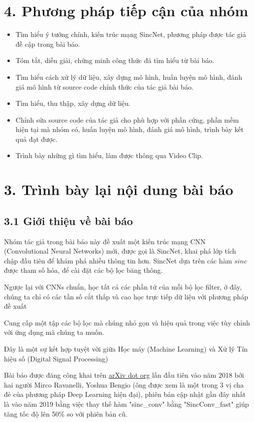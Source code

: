 \documentclass{article}
\begin{document}
	\section{4. Phương pháp tiếp cận của nhóm}
	\begin{itemize}
		\item Tìm hiểu ý tưởng chính, kiến trúc mạng SincNet, phương pháp được tác giả đề cập trong bài báo.
		\item Tóm tắt, diễn giải, chứng minh công thức đã tìm hiểu từ bài báo.
		\item Tìm hiểu cách xử lý dữ liệu, xây dựng mô hình, huấn luyện mô hình, đánh giá mô hình từ source code chính thức của tác giả bài báo.
		\item Tìm hiểu, thu thập, xây dựng dữ liệu.
		\item Chỉnh sửa source code của tác giả cho phù hợp với phần cứng, phần mềm hiện tại mà nhóm có, huấn luyện mô hình, đánh giá mô hình, trình bày kết quả đạt được.
		\item Trình bày những gì tìm hiểu, làm được thông qua Video Clip.
	\end{itemize}

	\section{3. Trình bày lại nội dung bài báo}
	
	\subsection{3.1 Giới thiệu về bài báo}
	
	\qquad Nhóm tác giả trong bài báo này đề xuất một kiến trúc mạng CNN (Convolutional Neural Networks) mới, được gọi là SincNet, khai phá lớp tích chập đầu tiên để khám phá nhiều thông tin hơn. SincNet dựa trên các hàm $sinc$ được tham số hóa, để cài đặt các bộ lọc băng thông.
	
	Ngược lại với CNNs chuẩn, học tất cả các phần tử của mỗi bộ lọc filter, ở đây, chúng ta chỉ có các tần số cắt thấp và cao học trực tiếp dữ liệu với phương pháp đề xuất
	
	Cung cấp một tập các bộ lọc mà chúng nhỏ gọn và hiệu quả trong việc tùy chỉnh với ứng dụng mà chúng ta muốn.
	
	Đây là một sự kết hợp tuyệt vời giữa Học máy (Machine Learning) và Xử lý Tín hiệu số (Digital Signal Processing)
	
	Bài báo được đăng công khai trên \href{arxiv.org}{arXiv dot org} lần đầu tiên vào năm 2018 bởi hai người Mirco Ravanelli, Yoshua Bengio (ông được xem là một trong 3 vị cha đẻ của phương pháp Deep Learning hiện đại), phiên bản cập nhật gần đây nhất là vào năm 2019 bằng việc thay thế hàm "sinc\_conv" bằng "SincConv\_fast" giúp tăng tốc độ lên 50\% so với phiên bản cũ.
	
\end{document}
